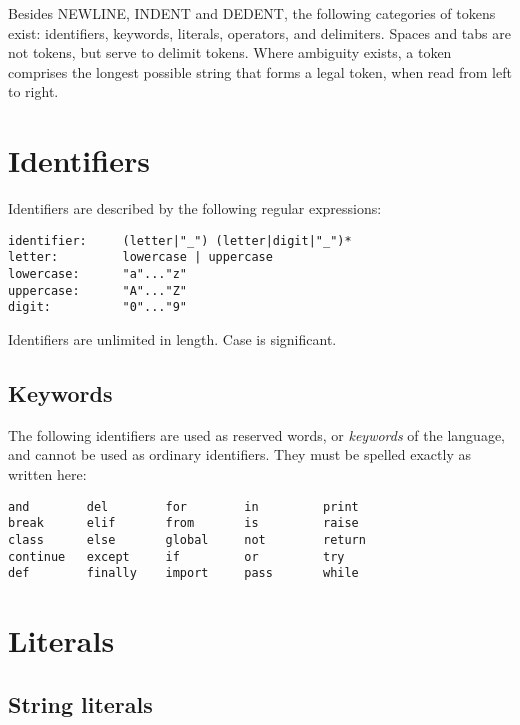 Besides NEWLINE, INDENT and DEDENT, the following categories of tokens
exist: identifiers, keywords, literals, operators, and delimiters.
Spaces and tabs are not tokens, but serve to delimit tokens.  Where
ambiguity exists, a token comprises the longest possible string that
forms a legal token, when read from left to right.

\section{Identifiers}

Identifiers are described by the following regular expressions:

\begin{verbatim}
identifier:     (letter|"_") (letter|digit|"_")*
letter:         lowercase | uppercase
lowercase:      "a"..."z"
uppercase:      "A"..."Z"
digit:          "0"..."9"
\end{verbatim}

Identifiers are unlimited in length.  Case is significant.

\subsection{Keywords}

The following identifiers are used as reserved words, or {\em
keywords} of the language, and cannot be used as ordinary
identifiers.  They must be spelled exactly as written here:

\begin{verbatim}
and        del        for        in         print
break      elif       from       is         raise
class      else       global     not        return
continue   except     if         or         try
def        finally    import     pass       while
\end{verbatim}


\section{Literals}

\subsection{String literals}

